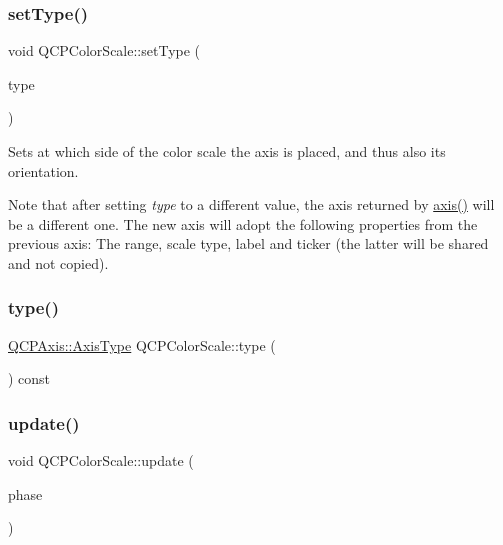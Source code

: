 \subsubsection{\texorpdfstring{set\+Type()}{setType()}}
{\footnotesize\ttfamily void Q\+C\+P\+Color\+Scale\+::set\+Type (\begin{DoxyParamCaption}\item[{\hyperlink{class_q_c_p_axis_ae2bcc1728b382f10f064612b368bc18a}{Q\+C\+P\+Axis\+::\+Axis\+Type}}]{type }\end{DoxyParamCaption})}

Sets at which side of the color scale the axis is placed, and thus also its orientation.

Note that after setting {\itshape type} to a different value, the axis returned by \hyperlink{class_q_c_p_color_scale_a39bdbdb3b212602a5a57f9f3ea444190}{axis()} will be a different one. The new axis will adopt the following properties from the previous axis\+: The range, scale type, label and ticker (the latter will be shared and not copied). \mbox{\label{class_q_c_p_color_scale_a85d7e286fbfc0c04c4b480aff3cb66fb}} 
\subsubsection{\texorpdfstring{type()}{type()}}
{\footnotesize\ttfamily \hyperlink{class_q_c_p_axis_ae2bcc1728b382f10f064612b368bc18a}{Q\+C\+P\+Axis\+::\+Axis\+Type} Q\+C\+P\+Color\+Scale\+::type (\begin{DoxyParamCaption}{ }\end{DoxyParamCaption}) const\hspace{0.3cm}{\ttfamily [inline]}}

\mbox{\label{class_q_c_p_color_scale_a259dcb6d3053a2cc3c197e9b1191ddbe}} 
\subsubsection{\texorpdfstring{update()}{update()}}
{\footnotesize\ttfamily void Q\+C\+P\+Color\+Scale\+::update (\begin{DoxyParamCaption}\item[{\hyperlink{class_q_c_p_layout_element_a0d83360e05735735aaf6d7983c56374d}{Update\+Phase}}]{phase }\end{DoxyParamCaption})\hspace{0.3cm}{\ttfamily [virtual]}}

